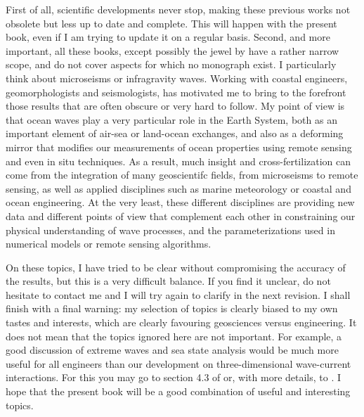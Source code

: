 \documentclass[a4paper]{book}  %
\begin{document}
First of all, scientific developments never stop, making these previous works not obsolete but less up to date 
and complete. This will happen with the present book, even if I am trying to update it on a regular basis. 
Second, and more important, all these books, except possibly the jewel by \cite{Phillips1977} have a rather narrow 
scope, and do not cover aspects for which no monograph exist. I particularly think about microseisms or infragravity waves. 
Working with coastal engineers, geomorphologists and seismologists, has motivated me to bring to 
the forefront those results that are often obscure or very hard to follow. My point of view is that 
ocean waves play a very particular role in the Earth System, both as an important element of air-sea or land-ocean exchanges, and also as a deforming mirror that 
modifies our measurements of ocean properties using remote sensing and even in situ techniques. As a result, much insight and cross-fertilization 
can come from the integration of many geoscientifc fields, from 
microseisms to remote sensing, as well as applied disciplines such as marine meteorology or coastal and ocean engineering.
At the very least, these different disciplines are providing new data and different points of view that complement each other 
in constraining  our physical understanding of wave processes, and the parameterizations used in numerical models or remote sensing algorithms. 

On these topics, I have tried to be clear without compromising the 
accuracy of the results, but this is a very difficult balance. If you find it unclear, do not hesitate to contact me
and I will try again to clarify in the next revision. I shall finish with a final warning:  my selection of topics is clearly biased to my own tastes and 
interests, which are clearly favouring geosciences versus engineering. It does not mean that the topics ignored here are not important. 
For example, a good discussion of 
extreme waves and sea state analysis would be much more useful for all engineers 
than our development on three-dimensional wave-current interactions. For this you may go to section 4.3 of \cite{Holthuijsen2007} or, with more details, to \cite{Boccotti2000}.
I hope that the present book will be a good combination 
of useful and interesting topics. \\
\end{document}
